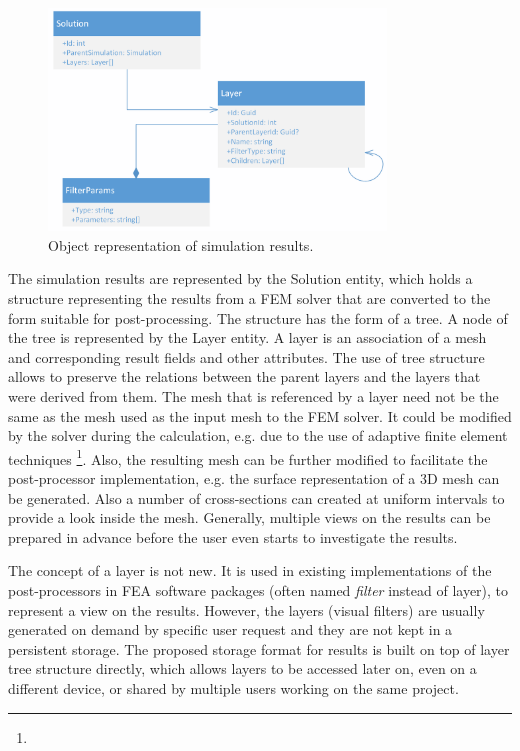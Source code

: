 \begin{figure}[H]
    \centering
    \includegraphics[width=0.8\textwidth]{figures/chapter-data-management/results-class-diagram}
    \decoRule
    \caption{Object representation of simulation results.}
    \label{fig:results-class-diagram}
\end{figure}

The simulation results are represented by the Solution entity, which holds a structure representing the results from a FEM solver that are converted to the form suitable for post-processing. The structure has the form of a tree. A node of the tree is represented by the Layer entity. A layer is an association of a mesh and corresponding result fields and other attributes. The use of tree structure allows to preserve the relations between the parent layers and the layers that were derived from them. The mesh that is referenced by a layer need not be the same as the mesh used as the input mesh to the FEM solver. It could be modified by the solver during the calculation, e.g. due to the use of adaptive finite element techniques \footnote{}. Also, the resulting mesh can be further modified to facilitate the post-processor implementation, e.g. the surface representation of a 3D mesh can be generated. Also a number of cross-sections can created at uniform intervals to provide a look inside the mesh. Generally, multiple views on the results can be prepared in advance before the user even starts to investigate the results.

The concept of a layer is not new. It is used in existing implementations of the post-processors in FEA software packages (often named \textit{filter} instead of layer), to represent a view on the results. However, the layers (visual filters) are usually generated on demand by specific user request and they are not kept in a persistent storage. The proposed storage format for results is built on top of layer tree structure directly, which allows layers to be accessed later on, even on a different device, or shared by multiple users working on the same project.


